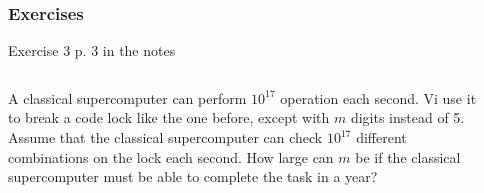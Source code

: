 \documentclass[10pt]{beamer}
\begin{document}
\begin{frame}
  \frametitle{Exercises}
  \begin{block}{Exercise 3 p. 3 in the notes}
    \begin{columns}
    \begin{column}{0.6\linewidth}
    A classical supercomputer can perform $10^{17}$ operation each second. Vi use it to break a code lock like the one before, except with $m$ digits instead of 5. Assume that the classical supercomputer can check $10^{17}$ different combinations on the lock each second. How large can $m$ be if the classical supercomputer must be able to complete the task in a year?
    \end{column}
    \begin{column}{0.3\linewidth}


\end{column}
\end{columns}
\end{block}
\end{frame}
\end{document}

